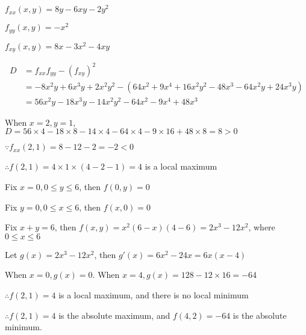 \documentclass{article}
\begin{document}
  $f_{xx}(x, y) = 8y - 6xy - 2y^2$
  
  $f_{yy}(x, y) = -x^2$

  $f_{xy}(x, y) = 8x - 3x^2 - 4xy$

  $$\begin{aligned}
    D &= f_{xx}f_{yy} - (f_{xy})^2 \\
    &= -8x^2y + 6x^3y + 2x^2y^2 - (64x^2 + 9x^4 + 16x^2y^2 - 48x^3 - 64x^2y + 24x^3y) \\
    &= 56x^2y - 18x^3y - 14x^2y^2 - 64x^2 - 9x^4 + 48x^3
  \end{aligned}$$

  When $x = 2, y = 1$, $D = 56 \times 4 - 18 \times 8 - 14 \times 4 - 64 \times 4 - 9 \times 16 + 48 \times 8 = 8 > 0$

  $\because f_{xx}(2, 1) = 8 - 12 - 2 = -2 < 0$

  $\therefore f(2, 1) = 4\times 1 \times (4-2-1) = 4$ is a local maximum

  Fix $x = 0, 0 \leq y \leq 6$, then $f(0, y) = 0$

  Fix $y = 0, 0 \leq x \leq 6$, then $f(x, 0) = 0$

  Fix $x + y = 6$, then $f(x, y) = x^2(6-x)(4-6) = 2x^3 - 12x^2$, where $0 \leq x \leq 6$

  Let $g(x) = 2x^3 - 12x^2$, then $g'(x) = 6x^2 - 24x = 6x(x - 4)$

  When $x = 0, g(x) = 0$. When $x = 4, g(x) = 128 - 12 \times 16 = -64$

  $\therefore f(2, 1) = 4$ is a local maximum, and there is no local minimum

  $\therefore f(2, 1) = 4$ is the absolute maximum, and $f(4, 2) = -64$ is the absolute minimum.
\end{document}
